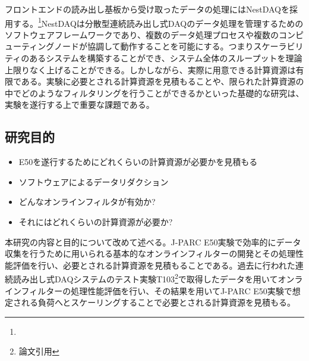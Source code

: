 \documentclass[../main.tex]{subfiles}
\begin{document}
フロントエンドの読み出し基板から受け取ったデータの処理にはNestDAQを採用する。\footnote{}NestDAQは分散型連続読み出し式DAQのデータ処理を管理するためのソフトウェアフレームワークであり、複数のデータ処理プロセスや複数のコンピューティングノードが協調して動作することを可能にする。つまりスケーラビリティのあるシステムを構築することができ、システム全体のスループットを理論上限りなく上げることができる。しかしながら、実際に用意できる計算資源は有限である。実験に必要とされる計算資源を見積もることや、限られた計算資源の中でどのようなフィルタリングを行うことができるかといった基礎的な研究は、実験を遂行する上で重要な課題である。

\subsection{研究目的}
\begin{tcolorbox}[
  title=執筆メモ,
  colback=yellow!8,
  colframe=black!30,
  breakable
]
\begin{itemize}
  \item E50を遂行するためにどれくらいの計算資源が必要かを見積もる
  \item ソフトウェアによるデータリダクション
  \item どんなオンラインフィルタが有効か?
  \item それにはどれくらいの計算資源が必要か?
\end{itemize}
\end{tcolorbox}

本研究の内容と目的について改めて述べる。J-PARC E50実験で効率的にデータ収集を行うために用いられる基本的なオンラインフィルターの開発とその処理性能評価を行い、必要とされる計算資源を見積もることである。過去に行われた連続読み出し式DAQシステムのテスト実験T103\footnote{論文引用}で取得したデータを用いてオンラインフィルターの処理性能評価を行い、その結果を用いてJ-PARC E50実験で想定される負荷へとスケーリングすることで必要とされる計算資源を見積もる。
\end{document}
